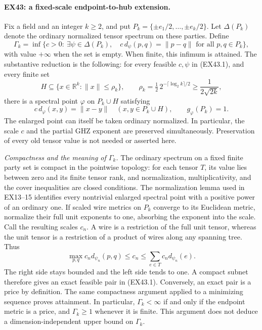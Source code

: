 \paragraph{EX43: a fixed-scale endpoint-to-hub extension.}
Fix a field and an integer $k\ge2$, and put
$P_k=\{\pm e_1/2,\ldots,\pm e_k/2\}$.
Let $\Delta(P_k)$ denote the ordinary normalized tensor spectrum on these
parties. Define
\[
 \Gamma_k=\inf\{c>0:\ \exists\psi\in\Delta(P_k),\quad
           c\,d_\psi(p,q)=\|p-q\|\text{ for all }p,q\in P_k\},
 \tag{EX43.1}
\]
with value $+\infty$ when the set is empty. When finite, this infimum is
attained. The substantive reduction is the following: for every feasible
$c,\psi$ in (EX43.1), and every finite set
\[
 H\subseteq \{x\in\mathbb R^k:\|x\|\le\rho_k\},\qquad
 \rho_k=\tfrac12\,2^{-\lceil\log_2k\rceil/2}
             \ge\frac1{2\sqrt{2k}},
 \tag{EX43.2}
\]
there is a spectral point $\varphi$ on $P_k\cup H$ satisfying
\[
 c\,d_\varphi(x,y)=\|x-y\|\quad(x,y\in P_k\cup H),
 \qquad g_\varphi(P_k)=1.
 \tag{EX43.3}
\]
The enlarged point can itself be taken ordinary normalized. In particular,
the scale $c$ and the partial GHZ exponent are preserved simultaneously.
Preservation of every old tensor value is not needed or asserted here.

\emph{Compactness and the meaning of $\Gamma_k$.}
The ordinary spectrum on a fixed finite party set is compact in the
pointwise topology: for each tensor $T$, its value lies between zero and
its finite tensor rank, and normalization, multiplicativity, and the
cover inequalities are closed conditions. The normalization lemma used
in EX13--15 identifies every nontrivial enlarged spectral point with a
positive power of an ordinary one. If scaled wire metrics on $P_k$
converge to its Euclidean metric, normalize their full unit exponents
to one, absorbing the exponent into the scale. Call the resulting
scales $c_n$. A wire is a restriction of the full unit tensor, whereas
the unit tensor is a restriction of a product of wires along any
spanning tree. Thus
\[
 \max_{p,q}c_n d_{\psi_n}(p,q)\le c_n
 \le\sum_{e\in T}c_n d_{\psi_n}(e).
\]
The right side stays bounded and the left side tends to one. A compact
subnet therefore gives an exact feasible pair in (EX43.1). Conversely,
an exact pair is a price by definition. The same compactness argument
applied to a minimizing sequence proves attainment. In particular,
$\Gamma_k<\infty$ if and only if the endpoint metric is a price, and
$\Gamma_k\ge1$ whenever it is finite. This argument does not deduce a
dimension-independent upper bound on $\Gamma_k$.

